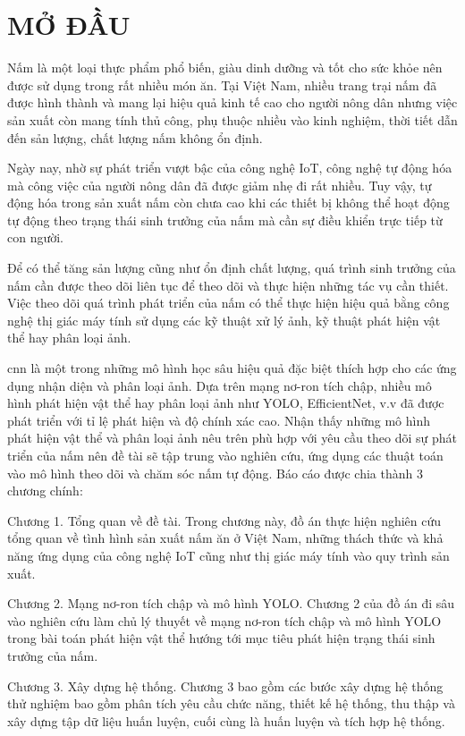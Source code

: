 \cleardoublepage
{}
\chapter*{ MỞ ĐẦU }

Nấm là một loại thực phẩm phổ biến, giàu dinh dưỡng và tốt cho sức khỏe nên được sử dụng trong rất nhiều món ăn. Tại Việt Nam, nhiều trang trại nấm đã được hình thành và mang lại hiệu quả kinh tế cao cho người nông dân nhưng việc sản xuất còn mang tính thủ công, phụ thuộc nhiều vào kinh nghiệm, thời tiết dẫn đến sản lượng, chất lượng nấm không ổn định.

Ngày nay, nhờ sự phát triển vượt bậc của công nghệ IoT, công nghệ tự động hóa mà công việc của người nông dân đã được giảm nhẹ đi rất nhiều. Tuy vậy, tự động hóa trong sản xuất nấm còn chưa cao khi các thiết bị không thể hoạt động tự động theo trạng thái sinh trưởng của nấm mà cần sự điều khiển trực tiếp từ con người.

Để có thể tăng sản lượng cũng như ổn định chất lượng, quá trình sinh trưởng của nấm cần được theo dõi liên tục để theo dõi và thực hiện những tác vụ cần thiết. Việc theo dõi quá trình phát triển của nấm có thể thực hiện hiệu quả bằng công nghệ thị giác máy tính sử dụng các kỹ thuật xử lý ảnh, kỹ thuật phát hiện vật thể hay phân loại ảnh.

\acrlong{cnn} là một trong những mô hình học sâu hiệu quả đặc biệt thích hợp cho các ứng dụng nhận diện và phân loại ảnh. Dựa trên mạng nơ-ron tích chập, nhiều mô hình phát hiện vật thể hay phân loại ảnh như YOLO, EfficientNet, v.v đã được phát triển với tỉ lệ phát hiện và độ chính xác cao. Nhận thấy những mô hình phát hiện vật thể và phân loại ảnh nêu trên phù hợp với yêu cầu theo dõi sự phát triển của nấm nên đề tài sẽ tập trung vào nghiên cứu, ứng dụng các thuật toán vào mô hình theo dõi và chăm sóc nấm tự động. Báo cáo được chia thành 3 chương chính:

Chương 1. Tổng quan về đề tài. Trong chương này, đồ án thực hiện nghiên cứu tổng quan về tình hình sản xuất nấm ăn ở Việt Nam, những thách thức và khả năng ứng dụng của công nghệ IoT cũng như thị giác máy tính vào quy trình sản xuất.

Chương 2. Mạng nơ-ron tích chập và mô hình YOLO. Chương 2 của đồ án đi sâu vào nghiên cứu làm chủ lý thuyết về mạng nơ-ron tích chập và mô hình YOLO trong bài toán phát hiện vật thể hướng tới mục tiêu phát hiện trạng thái sinh trưởng của nấm.

Chương 3. Xây dựng hệ thống. Chương 3 bao gồm các bước xây dựng hệ thống thử nghiệm bao gồm phân tích yêu cầu chức năng, thiết kế hệ thống, thu thập và xây dựng tập dữ liệu huấn luyện, cuối cùng là huấn luyện và tích hợp hệ thống.


